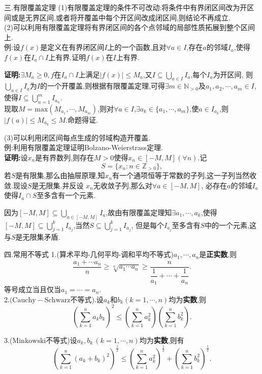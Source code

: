 \documentclass[UTF8]{ctexbeamer}
\begin{document}
    \begin{frame}{三.有限覆盖定理}
        (1)有限覆盖定理的条件不可改动:将条件中有界闭区间改为开区间或是无界区间,或者将开覆盖中每个开区间改成闭区间,则结论不再成立.
        \\(2)可以利用有限覆盖定理将有界闭区间的各个点邻域的局部性质拓展到整个区间上.
        \\例:设$f(x)$是定义在有界闭区间$I$上的一个函数,且对$\forall a\in I$,存在$a$的邻域$I_a$,使得$f(x)$在$I_a\cap I$上有界.证明$f(x)$在$I$上有界.
    \end{frame}
    \begin{frame}
        \textbf{证明:}$\exists M_a\geqslant 0,f$在$I_a\cap I$上满足$|f(x)|\leqslant M_a$,又$I\subseteq \bigcup\limits_{a\in I}I_a$,每个$I_a$为开区间,
        则$\bigcup\limits_{a\in I}I_a$为$I$的一个开覆盖,则根据有限覆盖定理,可得$\exists m\in\mathbb{N}_{>0}$及$a_1,a_2,\cdots,a_m\in I$,使得$I\subseteq\bigcup\limits_{n=1}^{m}I_{a_n}$.
        \\现取$M=\mathrm{max}(M_{a_1},\cdots,M_{a_m})$,则对$\forall a\in I$,$\exists a_k\in \{a_1,\cdots,a_m\}$,使$a\in I_{a_k}$,则$|f(a)|\leqslant M_{a_k}\leqslant M$.命题得证.
    \end{frame}
    \begin{frame}
        (3)可以利用闭区间每点生成的邻域构造开覆盖.
        \\例:利用有限覆盖定理证明Bolzano-Weierstrass定理.
        \pause
        \\\textbf{证明:}设${x_n}$是有界数列,则存在$M>0$使得$x_n\in [-M,M](\forall n)$.记
        \[S=\{x_n:n\in\mathbb{Z}_{>0}\},\]
        若$S$是有限集,那么由抽屉原理,知${x_n}$有一个通项恒等于常数的子列,这一子列当然收敛.现设$S$是无限集.并反设 ${x_n}$无收敛子列,那么对$\forall a\in [-M,M]$,
        必存在$a$的邻域$I_a$使得$I_a\cap S$至多含有一个元素.
    \end{frame}
    \begin{frame}
        因为$[-M,M]\subseteq \bigcup\limits_{a\in [-M,M]}I_a$,故由有限覆盖定理知$\exists a_1,\cdots,a_k$,使得$[-M,M]\subseteq\bigcup\limits_{j=1}^{k}I_{a_j}$,当然$S\subseteq \bigcup\limits_{j=1}^{k}I_{a_j}$,
        但是每个$I_{a_j}$至多含有$S$中的一个元素,这与$S$是无限集矛盾.
    \end{frame}
    \begin{frame}{四.常用不等式}
        1.(算术平均-几何平均-调和平均不等式)$a_1,\cdots,a_n$是\textbf{正实数},则
        \[\frac{a_1+\cdots a_n}{n}\geqslant \sqrt[n]{a_1\cdots a_n}\geqslant\frac{n}{\dfrac{1}{a_1}+\cdots+\dfrac{1}{a_n}}. \]
        等号成立当且仅当$a_1=\cdots=a_n$.
        \\2.$(\mathrm{Cauchy-Schwarz}$不等式).设$a_k$和$b_k(k=1,\cdots,n)$均为\textbf{实数},则
        $$\left(\sum_{k=1}^{n}a_kb_k\right)^2\leqslant \left(\sum_{k=1}^{n}a_k^2\right)\left(\sum_{k=1}^{n}b_k^2\right).$$
    \end{frame}
    \begin{frame}
        3.($\mathrm{Minkowski}$不等式)设$a_k,b_k\,(k=1,\cdots,n)$均为\textbf{实数},则有
        \[\left(\sum_{k=1}^{n}(a_k+b_k)^2\right)^{\frac{1}{2}}\leqslant \left(\sum_{k=1}^{n}a_k^2\right)^{\frac{1}{2}}+\left(\sum_{k=1}^{n}b_k^2\right)^{\frac{1}{2}}.\]
    \end{frame}
\end{document}
